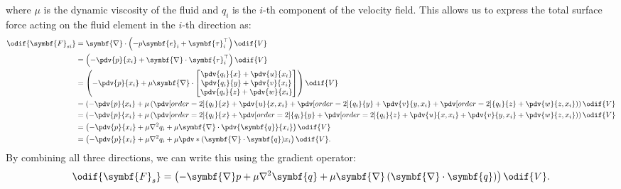 \documentclass{article}
\theoremstyle{definition}
\begin{document}
where \(\mu\) is the dynamic viscosity of the fluid and \(q_i\) is the
\(i\)-th component of the velocity field. This allows us to express the
total surface force acting on the fluid element in the \(i\)-th
direction as:
\begin{align*}
    \odif{\symbf{F}_{si}} & = \symbf{\nabla} \cdot \left( -p \symbf{e}_i + \symbf{\tau}_i^\top \right) \odif{V}                                          \\
                          & = \left( - \pdv{p}{x_i} + \symbf{\nabla} \cdot \symbf{\tau}_i^\top \right) \odif{V}                                          \\
                          & = \left( - \pdv{p}{x_i} + \mu \symbf{\nabla} \cdot
    \begin{bmatrix}
        \displaystyle \pdv{q_i}{x} + \pdv{u}{x_i} \\
        \displaystyle \pdv{q_i}{y} + \pdv{v}{x_i} \\
        \displaystyle \pdv{q_i}{z} + \pdv{w}{x_i}
    \end{bmatrix}
    \right) \odif{V}                                                                                                                                     \\
                          & = \left( - \pdv{p}{x_i} + \mu \left(
        \pdv[order=2]{q_i}{x} + \pdv{u}{x,x_i} +
        \pdv[order=2]{q_i}{y} + \pdv{v}{y,x_i} +
        \pdv[order=2]{q_i}{z} + \pdv{w}{z,x_i}
    \right) \right) \odif{V}                                                                                                                             \\
                          & = \left( - \pdv{p}{x_i} + \mu \left(
        \pdv[order=2]{q_i}{x} + \pdv[order=2]{q_i}{y} + \pdv[order=2]{q_i}{z} +
        \pdv{u}{x,x_i} + \pdv{v}{y,x_i} + \pdv{w}{z,x_i}
    \right) \right) \odif{V}                                                                                                                             \\
                          & = \left( - \pdv{p}{x_i} + \mu \nabla^2 q_i + \mu \symbf{\nabla} \cdot \pdv{\symbf{q}}{x_i} \right) \odif{V}                  \\
                          & = \left( - \pdv{p}{x_i} + \mu \nabla^2 q_i + \mu \pdv*{\left( \symbf{\nabla} \cdot \symbf{q} \right)}{x_i} \right) \odif{V}.
\end{align*}
By combining all three directions, we can write this using the gradient
operator:
\begin{equation*}
    \odif{\symbf{F}_s} = \left( -\symbf{\nabla} p + \mu \nabla^2 \symbf{q} + \mu \symbf{\nabla} \left( \symbf{\nabla} \cdot \symbf{q} \right) \right) \odif{V}.
\end{equation*}
\end{document}
